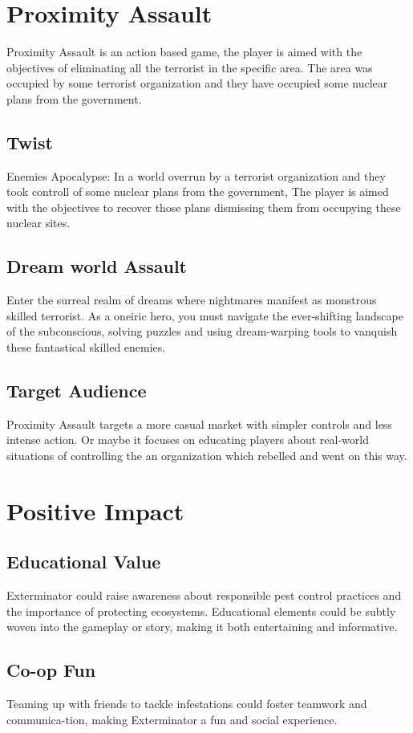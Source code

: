 \section{Proximity Assault}
Proximity Assault is an action based game, the player is aimed with the objectives of eliminating all the terrorist in the specific area. The area was occupied by some terrorist organization and they have occupied some nuclear plans from the government.
\subsection{Twist}
Enemies Apocalypse: In a world overrun by a terrorist organization and they took controll of some nuclear plans from the government, The player is aimed with the objectives to recover those plans dismissing them from occupying these nuclear sites.\\
\subsection{Dream world Assault} Enter the surreal realm of dreams where nightmares manifest as monstrous skilled terrorist. As a oneiric hero, you must navigate the ever-shifting landscape of the subconscious, solving puzzles and using dream-warping tools to vanquish these fantastical skilled enemies.
\subsection{Target Audience} Proximity Assault targets a more casual market with simpler controls and less intense action. Or maybe it focuses on educating players about real-world situations of controlling the an organization which rebelled and went on this way.
\section{Positive Impact}

\subsection{Educational Value }
Exterminator could raise awareness about responsible pest control practices and the importance of protecting ecosystems. Educational elements could be subtly woven into the gameplay or story, making it both entertaining and informative.
\subsection{Co-op Fun} Teaming up with friends to tackle infestations could foster teamwork and communica-tion, making Exterminator a fun and social experience.

